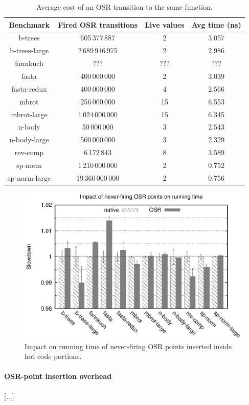 \begin{table} 
\caption{\label{tab:sameFun}Average cost of an OSR transition to the same function.} 
\begin{footnotesize}
    \begin{tabular}{ |c|c|c|c| }
        \hline
        Benchmark & Fired OSR transitions & Live values & Avg time (ns) \\ 
        \hline
        \hline
        b-trees & 605\,377\,887 & 2 & 3.057 \\ 
        \hline
        b-trees-large & 2\,689\,946\,975 & 2 & 2.986 \\ 
        \hline
        fannkuch & ??? & ??? & ??? \\ 
        \hline
        fasta & 400\,000\,000 & 2 & 3.039 \\ 
        \hline
        fasta-redux & 400\,000\,000 & 4 & 2.566 \\ 
        \hline
        mbrot & 256\,000\,000 & 15 & 6.553 \\ 
        \hline
        mbrot-large & 1\,024\,000\,000 & 15 & 6.345 \\ 
        \hline
        n-body & 50\,000\,000 & 3 & 2.543 \\ 
        \hline
        n-body-large & 500\,000\,000 & 3 & 2.329 \\ 
        \hline
        rev-comp & 6\,172\,843 & 8 & 3.589 \\ 
        \hline
        sp-norm & 1\,210\,000\,000 & 2 & 0.752 \\ 
        \hline
        sp-norm-large & 19\,360\,000\,000 & 2 & 0.756 \\
        \hline
    \end{tabular} 
\end{footnotesize}
\end{table}

\ifdefined\noauthorea
\begin{figure}[t]
\begin{center}
\includegraphics[width=0.7\columnwidth]{figures/code-quality-noBB/code-quality-noBB.eps}
\caption{\label{fig:code-quality} Impact on running time of never-firing OSR points inserted inside hot code portions.}
\end{center}
\end{figure}
\fi

\paragraph{OSR-point insertion overhead}
[...]
  

  
  
  
  
  
  
  
  
  
  
  
  